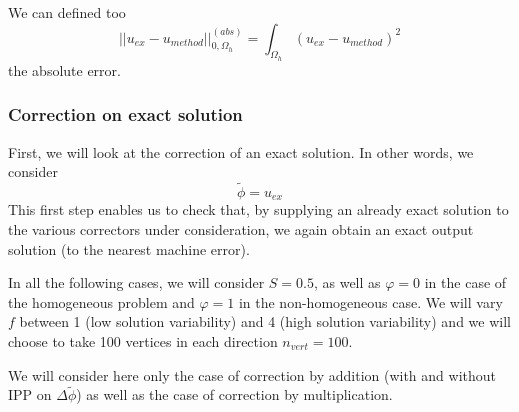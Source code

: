 We can defined too
\begin{equation*}
	||u_{ex}-u_{method}||_{0,\Omega_h}^{(abs)}=\int_{\Omega_h} (u_{ex}-u_{method})^2
\end{equation*}
the absolute error.

\subsubsection{Correction on exact solution} \label{Corr.results.ana}

First, we will look at the correction of an exact solution. In other words, we consider
\begin{equation*}
	\tilde{\phi}=u_{ex}
\end{equation*}
This first step enables us to check that, by supplying an already exact solution to the various correctors under consideration, we again obtain an exact output solution (to the nearest machine error).

In all the following cases, we will consider $S=0.5$, as well as $\varphi=0$ in the case of the homogeneous problem and $\varphi=1$ in the non-homogeneous case. We will vary $f$ between 1 (low solution variability) and 4 (high solution variability) and we will choose to take 100 vertices in each direction $n_{vert}=100$.

\begin{Rem}
	We will consider here only the case of correction by addition (with and without IPP on $\Delta\tilde{\phi}$) as well as the case of correction by multiplication.
\end{Rem}

